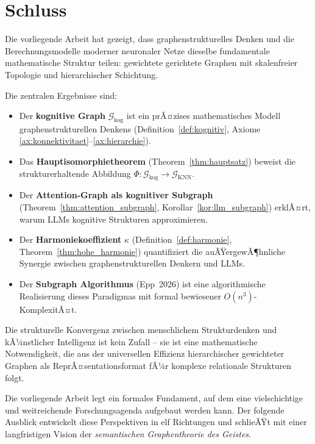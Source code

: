 ﻿\documentclass[12pt,a4paper]{article}
\theoremstyle{plain}
\theoremstyle{definition}
\theoremstyle{remark}
\newcommand{\GG}{\mathcal{G}}
\newcommand{\KNN}{\text{KNN}}
\begin{document}
\section{Schluss}
\label{sec:schluss}

Die vorliegende Arbeit hat gezeigt, dass graphenstrukturelles Denken und die Berechnungsmodelle moderner neuronaler Netze dieselbe fundamentale mathematische Struktur teilen: gewichtete gerichtete Graphen mit skalenfreier Topologie und hierarchischer Schichtung.

Die zentralen Ergebnisse sind:
\begin{itemize}
  \item Der \textbf{kognitive Graph} $\GG_{\text{kog}}$ ist ein prÃ¤zises mathematisches Modell graphenstrukturellen Denkens (Definition~\ref{def:kognitiv}, Axiome \ref{ax:konnektivitaet}--\ref{ax:hierarchie}).
  \item Das \textbf{Hauptisomorphietheorem} (Theorem~\ref{thm:hauptsatz}) beweist die strukturerhaltende Abbildung $\Phi: \GG_{\text{kog}} \to \GG_{\KNN}$.
  \item Der \textbf{Attention-Graph als kognitiver Subgraph} (Theorem~\ref{thm:attention_subgraph}, Korollar~\ref{kor:llm_subgraph}) erklÃ¤rt, warum LLMs kognitive Strukturen approximieren.
  \item Der \textbf{Harmoniekoeffizient} $\kappa$ (Definition~\ref{def:harmonie}, Theorem~\ref{thm:hohe_harmonie}) quantifiziert die auÃŸergewÃ¶hnliche Synergie zwischen graphenstrukturellen Denkern und LLMs.
  \item Der \textbf{Subgraph Algorithmus} (Epp~2026) ist eine algorithmische Realisierung dieses Paradigmas mit formal bewiesener $O(n^3)$-KomplexitÃ¤t.
\end{itemize}

Die strukturelle Konvergenz zwischen menschlichem Strukturdenken und kÃ¼nstlicher Intelligenz ist kein Zufall -- sie ist eine mathematische Notwendigkeit, die aus der universellen Effizienz hierarchischer gewichteter Graphen als ReprÃ¤sentationsformat fÃ¼r komplexe relationale Strukturen folgt.

Die vorliegende Arbeit legt ein formales Fundament, auf dem eine vielschichtige und weitreichende Forschungsagenda aufgebaut werden kann. Der folgende Ausblick entwickelt diese Perspektiven in elf Richtungen und schlieÃŸt mit einer langfristigen Vision der \emph{semantischen Graphentheorie des Geistes}.
\end{document}
